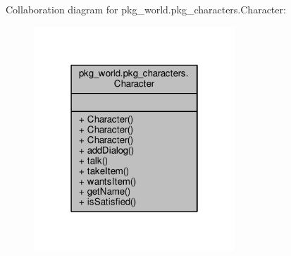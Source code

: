 Collaboration diagram for pkg\-\_\-world.\-pkg\-\_\-characters.\-Character\-:\nopagebreak
\begin{figure}[H]
\begin{center}
\leavevmode
\includegraphics[width=214pt]{classpkg__world_1_1pkg__characters_1_1Character__coll__graph}
\end{center}
\end{figure}
